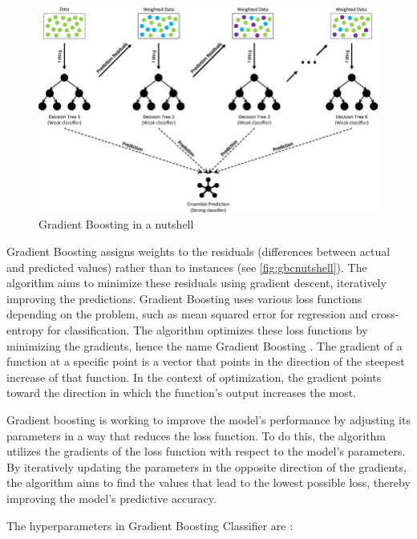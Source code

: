 \begin{figure}
    \centering
    \includegraphics[scale=2]{images/gbc.png}
    \caption{Gradient Boosting in a nutshell \citep{gbcdiagram}}
    \label{fig:gbcnutshell}
\end{figure}



Gradient Boosting assigns weights to the residuals (differences between actual and predicted values) rather than to instances (see \autoref{fig:gbcnutshell}). The algorithm aims to minimize these residuals using gradient descent, iteratively improving the predictions. Gradient Boosting uses various loss functions depending on the problem, such as mean squared error for regression and cross-entropy for classification. The algorithm optimizes these loss functions by minimizing the gradients, hence the name Gradient Boosting \citep{Friedman2001}. The gradient of a function at a specific point is a vector that points in the direction of the steepest increase of that function. In the context of optimization, the gradient points toward the direction in which the function's output increases the most. 



Gradient boosting is working to improve the model's performance by adjusting its parameters in a way that reduces the loss function. To do this, the algorithm utilizes the gradients of the loss function with respect to the model's parameters. By iteratively updating the parameters in the opposite direction of the gradients, the algorithm aims to find the values that lead to the lowest possible loss, thereby improving the model's predictive accuracy.

The hyperparameters in Gradient Boosting Classifier are \citep{scikit-learn}:

